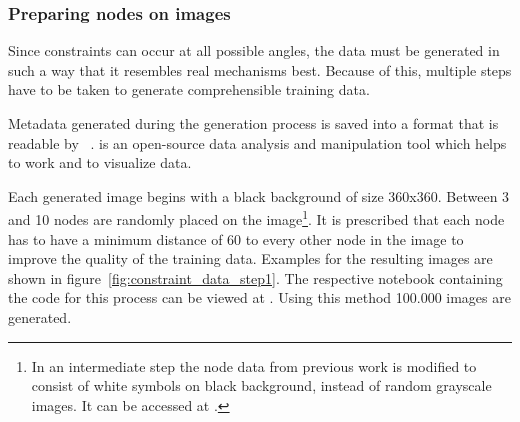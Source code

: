 \subsubsection{Preparing nodes on images}

Since constraints can occur at all possible angles, the data must be generated in such a way that it resembles real mechanisms best.
Because of this, multiple steps have to be taken to generate comprehensible training data.

Metadata generated during the generation process is saved into a format that is readable by ~\cite{pandas2021}.
 is an open-source data analysis and manipulation tool which helps to work and to visualize data.

Each generated image begins with a black background of size 360x360.
Between 3 and 10 nodes are randomly placed on the image\footnote{In an intermediate step the node data from previous work is modified to consist of white symbols on black background, instead of random grayscale images. It can be accessed at .}.
It is prescribed that each node has to have a minimum distance of 60 to every other node in the image to improve the quality of the training data.
Examples for the resulting images are shown in figure~\ref{fig:constraint_data_step1}.
The respective notebook containing the code for this process can be viewed at .
Using this method 100.000 images are generated.

